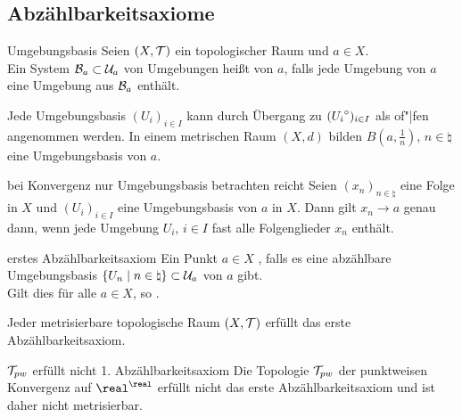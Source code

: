 \pagebreak

\subsection{%
    Abzählbarkeitsaxiome%
}

\begin{Def}{Umgebungsbasis}
    Seien $(X, \mathcal{T})$ ein topologischer Raum und $a \in X$. \\
    Ein System $\mathcal{B}_a \subset \mathcal{U}_a$ von Umgebungen heißt
     von $a$, falls jede Umgebung von $a$ eine
    Umgebung aus $\mathcal{B}_a$ enthält.
\end{Def}

\begin{Bsp}
    Jede Umgebungsbasis $(U_i)_{i \in I}$ kann durch Übergang zu
    $({U_i}^\circ)_{i \in I}$ als of"|fen angenommen werden.
    In einem metrischen Raum $(X, d)$ bilden $B\!\left(a, \frac{1}{n}\right)$,
    $n \in \natural$ eine Umgebungsbasis von $a$.
\end{Bsp}

\begin{Lemma}{bei Konvergenz nur Umgebungsbasis betrachten reicht}
    Seien $(x_n)_{n \in \natural}$ eine Folge in $X$ und
    $(U_i)_{i \in I}$ eine Umgebungsbasis von $a$ in $X$.
    Dann gilt $x_n \to a$ genau dann, wenn jede Umgebung $U_i$, $i \in I$
    fast alle Folgenglieder $x_n$ enthält.
\end{Lemma}

\linie

\begin{Def}{erstes Abzählbarkeitsaxiom}
    Ein Punkt $a \in X$ , falls
    es eine abzählbare Umgebungsbasis
    $\{U_n \;|\; n \in \natural\} \subset \mathcal{U}_a$ von $a$ gibt. \\
    Gilt dies für alle $a \in X$, so
    .
\end{Def}

\begin{Bsp}
    Jeder metrisierbare topologische Raum $(X, \mathcal{T})$ erfüllt das erste
    Abzählbarkeitsaxiom.
\end{Bsp}

\begin{Satz}{$\mathcal{T}_{pw}$ erfüllt nicht 1. Abzählbarkeitsaxiom}
    Die Topologie $\mathcal{T}_{pw}$ der punktweisen Konvergenz auf
    $\real^\real$ erfüllt nicht das erste Abzählbarkeitsaxiom und ist daher
    nicht metrisierbar.
\end{Satz}

